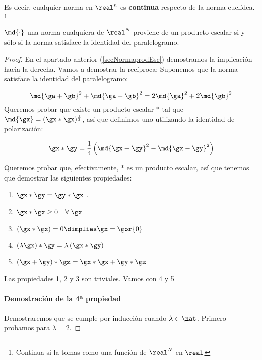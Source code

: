 \documentclass{apuntes}
\begin{document}
Es decir, cualquier norma en $\real^n$ es \textbf{continua} respecto de la norma euclídea. \footnote{Continua si la tomas como una función de $\real^N$ en $\real$}

\begin{theorem}
$\md{\cdot}$ una norma cualquiera de $\real^N$ proviene de un producto escalar si y sólo si la norma satisface la identidad del paralelogramo. 
\end{theorem}

\begin{proof}
En el apartado anterior (\ref{secNormaprodEsc}) demostramos la implicación hacia la derecha. Vamos a demostrar la recíproca:
Suponemos que la norma satisface la identidad del paralelogramo:

\begin{equation}
 \md{\ga+\gb}^2 + \md{\ga-\gb}^2 = 2 \md{\ga}^2 + 2\md{\gb}^2 \label{eqParalelogramo}
\end{equation}
Queremos probar que existe un producto escalar $\ast$ tal que $\md{\gx} = (\gx\ast \gx)^\frac{1}{2}$, así que definimos uno utilizando la identidad de polarización: 

\begin{equation}
 \gx\ast\gy = \frac{1}{4} \left( \md{\gx+\gy} ^ 2 - \md{\gx-\gy} ^ 2\right) \label{eqPolarizacion}
 \end{equation}

Queremos probar que, efectivamente, $\ast$ es un producto escalar, así que tenemos que demostrar las siguientes propiedades:
\begin{enumerate}
 \item $\gx\ast\gy = \gy\ast\gx$ .
 \item $\gx\ast\gx \ge 0\quad \forall\; \gx$
 \item $(\gx\ast\gx) = 0 \dimplies \gx=\gor{0}$ 
 \item $(\lambda \gx) \ast \gy = \lambda\left(\gx\ast\gy\right)$
 \item $(\gx+\gy)\ast\gz =\gx\ast\gx + \gy\ast\gz $
\end{enumerate}

Las propiedades 1, 2 y 3 son triviales. Vamos con 4 y 5

\paragraph{Demostración de la 4ª propiedad}

Demostraremos que se cumple por inducción cuando $\lambda\in\nat$. Primero probamos para $\lambda = 2$.


\end{proof}
\end{document}
